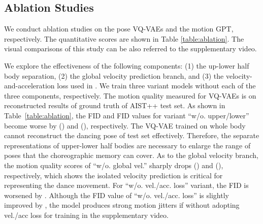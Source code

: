 \vspace{-4pt}
\subsection{Ablation Studies}
\label{sec:ablation}
\vspace{-3pt}

We conduct ablation studies on the pose VQ-VAEs and the motion GPT, respectively.
The quantitative scores are shown in Table \ref{table:ablation}.
The visual comparisons of this study can be also referred to the supplementary video.





We explore the effectiveness of the following components: (1) the up-lower half body separation, (2) the global velocity prediction branch, and (3) the velocity-and-acceleration loss used in .
We train three variant models without each of the three components, respectively.
The motion quality measured for VQ-VAEs is on reconstructed results of ground truth of AIST++ test set.
As shown in Table~\ref{table:ablation}, the FID and FID values for variant ``w/o. upper/lower'' become worse by  () and  (), respectively.
The VQ-VAE trained on whole body cannot reconstruct the dancing pose of test set effectively.
Therefore, the separate representations of upper-lower half bodies are necessary to enlarge the range of poses that the choreographic memory can cover.
As to the global velocity branch, the motion quality scores of ``w/o. global vel.'' sharply drops  () and  (), respectively, which shows the isolated velocity prediction is critical for representing the dance movement.
For ``w/o. vel./acc. loss'' variant, the FID is worsened by .
Although the FID value of ``w/o. vel./acc. loss'' is slightly improved by , 
the model produces strong motion jitters if without adopting vel./acc loss for training in the supplementary video.



